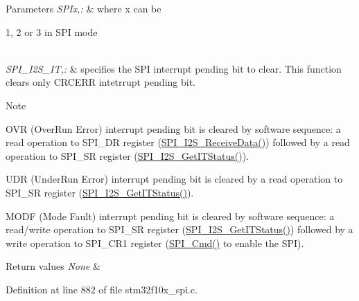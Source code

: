 \begin{DoxyParams}{Parameters}
{\em S\-P\-Ix,\-:} & where x can be
\begin{DoxyItemize}
\item 1, 2 or 3 in S\-P\-I mode 
\end{DoxyItemize}\\
\hline
{\em S\-P\-I\-\_\-\-I2\-S\-\_\-\-I\-T,\-:} & specifies the S\-P\-I interrupt pending bit to clear. This function clears only C\-R\-C\-E\-R\-R intetrrupt pending bit. \\
\hline
\end{DoxyParams}
\begin{DoxyNote}{Note}

\begin{DoxyItemize}
\item O\-V\-R (Over\-Run Error) interrupt pending bit is cleared by software sequence\-: a read operation to S\-P\-I\-\_\-\-D\-R register (\hyperlink{group___s_p_i___exported___functions_gab77de76547f3bff403236b263b070a30}{S\-P\-I\-\_\-\-I2\-S\-\_\-\-Receive\-Data()}) followed by a read operation to S\-P\-I\-\_\-\-S\-R register (\hyperlink{group___s_p_i___exported___functions_ga72decbc1cd79f8fad92a2204beca6bc5}{S\-P\-I\-\_\-\-I2\-S\-\_\-\-Get\-I\-T\-Status()}).
\item U\-D\-R (Under\-Run Error) interrupt pending bit is cleared by a read operation to S\-P\-I\-\_\-\-S\-R register (\hyperlink{group___s_p_i___exported___functions_ga72decbc1cd79f8fad92a2204beca6bc5}{S\-P\-I\-\_\-\-I2\-S\-\_\-\-Get\-I\-T\-Status()}).
\item M\-O\-D\-F (Mode Fault) interrupt pending bit is cleared by software sequence\-: a read/write operation to S\-P\-I\-\_\-\-S\-R register (\hyperlink{group___s_p_i___exported___functions_ga72decbc1cd79f8fad92a2204beca6bc5}{S\-P\-I\-\_\-\-I2\-S\-\_\-\-Get\-I\-T\-Status()}) followed by a write operation to S\-P\-I\-\_\-\-C\-R1 register (\hyperlink{group___s_p_i___exported___functions_gaa31357879a65ee1ed7223f3b9114dcf3}{S\-P\-I\-\_\-\-Cmd()} to enable the S\-P\-I). 
\end{DoxyItemize}
\end{DoxyNote}

\begin{DoxyRetVals}{Return values}
{\em None} & \\
\hline
\end{DoxyRetVals}


Definition at line 882 of file stm32f10x\-\_\-spi.\-c.

